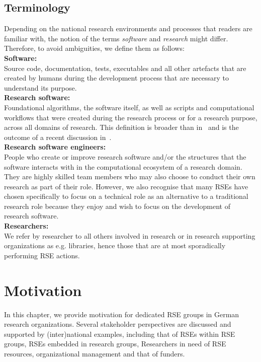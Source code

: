 \documentclass{article}
\makeatletter
\newcommand*{\eg}{e.g.\@\xspace}
\makeatother
\begin{document}
\subsection{Terminology}
Depending on the national research
environments and processes that readers are familiar with, the notion of the terms \emph{software} and \emph{research} might differ.
Therefore, to avoid ambiguities, we define them as follows:\\
\textbf{Software:}\\
Source code, documentation, tests, executables
and all other artefacts that are created by humans during the development process
that are necessary to understand its purpose.\\
\textbf{Research software:}\\
Foundational algorithms, the software itself,
as well as scripts and computational workflows that were created
during the research process or for a research purpose, across all domains of research.
This definition is broader than in~\autocite{FAIR4RS} and is the outcome of a recent
discussion in~\autocite{Gruenpeter2021}.\\
\textbf{Research software engineers:}\\
People who
create or improve research software and/or the structures that the software interacts with
in the computational ecosystem of a research domain.
They are highly skilled team members who may also choose to conduct their own research as
part of their role.
However, we also recognise that many RSEs have chosen specifically to focus on a technical
role as an alternative to a traditional research role because they enjoy and wish to focus
on the development of research software.\\
\textbf{Researchers:}\\
We refer by researcher to all others involved in research or in research supporting organizations as \eg libraries,
hence those that are at most sporadically performing RSE actions.

\section{Motivation}

In this chapter, we provide motivation for dedicated RSE groups in German research organizations.
Several stakeholder perspectives are discussed and supported by (inter)national examples, including that of RSEs within RSE groups, RSEs embedded in research groups, Researchers in need of RSE resources, organizational management and that of funders.
\end{document}
